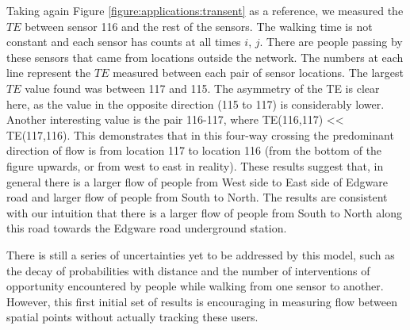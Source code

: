 Taking again Figure \ref{figure:applications:transent} as a reference, we measured the $TE$ between sensor 116 and the rest of the sensors.
The walking time is not constant and each sensor has counts at all times $i$, $j$.
There are people passing by these sensors that came from locations outside the network.
The numbers at each line represent the $TE$ measured between each pair of sensor locations.
The largest $TE$ value found was between 117 and 115.
The asymmetry of the TE is clear here, as the value in the opposite direction (115 to 117) is considerably lower.
Another interesting value is the pair 116-117, where TE(116,117) << TE(117,116).
This demonstrates that in this four-way crossing the predominant direction of flow is from location 117 to location 116 (from the bottom of the figure upwards, or from west to east in reality).
These results suggest that, in general there is a larger flow of people from West side to East side of Edgware road and larger flow of people from South to North.
The results are consistent with our intuition that there is a larger flow of people from South to North along this road towards the Edgware road underground station.

There is still a series of uncertainties yet to be addressed by this model, such as the decay of probabilities with distance and the number of interventions of opportunity encountered by people while walking from one sensor to another.
However, this first initial set of results is encouraging in measuring flow between spatial points without actually tracking these users.
